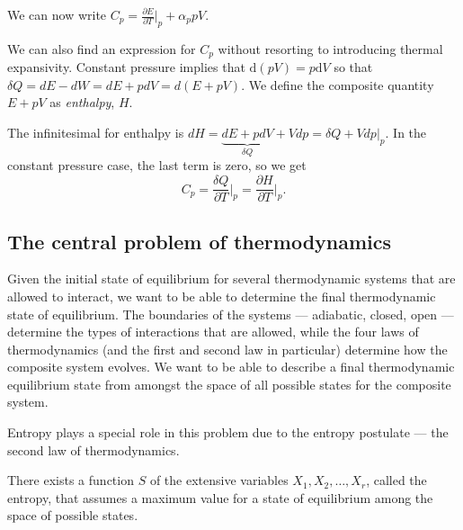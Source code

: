 We can now write $C_p = \frac{\partial E}{\partial T}\vert_{p} + \alpha_p pV$. 


We can also find an expression for $C_p$ without resorting to introducing thermal expansivity. Constant pressure implies that $\mathrm{d}(pV)=p\mathrm{d}V$ so that $\delta Q = dE - dW = dE +pdV = d(E+pV)$. We define the composite quantity $E+pV$ as \emph{enthalpy}, $H$.

The infinitesimal for enthalpy is $dH = \underbrace{dE +pdV}_{\delta Q}+ Vdp = \delta Q + Vdp\vert_{p}$. In the constant pressure case, the last term is zero, so we get 
$$
	C_p = \frac{\delta Q}{\partial T}\bigg\vert_{p} = \frac{\partial H}{\partial T}\bigg\vert_{p}. 
$$




\subsection{The central problem of thermodynamics}
Given the initial state of equilibrium for several thermodynamic systems that are allowed to interact, we want to be able to determine the final thermodynamic state of equilibrium. The boundaries of the systems --- adiabatic, closed, open --- determine the types of interactions that are allowed, while the four laws of thermodynamics (and the first and second law in particular) determine how the composite system evolves. We want to be able to describe a final thermodynamic equilibrium state from amongst the space of all possible states for the composite system.

Entropy plays a special role in this problem due to the entropy postulate --- the second law of thermodynamics.

\begin{definition}
There exists a function $S$ of the extensive variables $X_1,X_2,\ldots,X_r$, called the entropy, that assumes a maximum value for a state of equilibrium among the space of possible states.
\end{definition}

